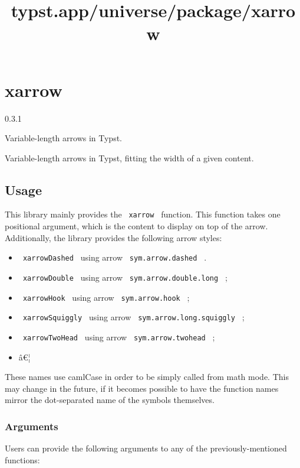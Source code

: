 \title{typst.app/universe/package/xarrow}

\label{banner}
\section{xarrow}\label{xarrow}

{ 0.3.1 }

Variable-length arrows in Typst.

\label{readme}
Variable-length arrows in Typst, fitting the width of a given content.

\subsection{Usage}\label{usage}

This library mainly provides the \texttt{\ xarrow\ } function. This
function takes one positional argument, which is the content to display
on top of the arrow. Additionally, the library provides the following
arrow styles:

\begin{itemize}
\tightlist
\item
  \texttt{\ xarrowDashed\ } using arrow \texttt{\ sym.arrow.dashed\ } .
\item
  \texttt{\ xarrowDouble\ } using arrow
  \texttt{\ sym.arrow.double.long\ } ;
\item
  \texttt{\ xarrowHook\ } using arrow \texttt{\ sym.arrow.hook\ } ;
\item
  \texttt{\ xarrowSquiggly\ } using arrow
  \texttt{\ sym.arrow.long.squiggly\ } ;
\item
  \texttt{\ xarrowTwoHead\ } using arrow \texttt{\ sym.arrow.twohead\ }
  ;
\item
  â€¦
\end{itemize}

These names use camlCase in order to be simply called from math mode.
This may change in the future, if it becomes possible to have the
function names mirror the dot-separated name of the symbols themselves.

\subsubsection{Arguments}\label{arguments}

Users can provide the following arguments to any of the
previously-mentioned functions:

